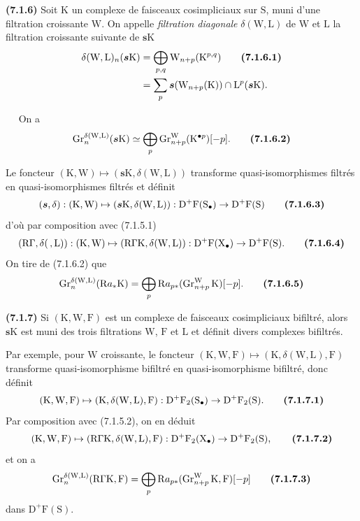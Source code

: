 \documentclass[11pt,leqno]{article}
\newcommand{\Page}[1]{\ifvmode\noindent\else\unskip\ \fi{\footnotesize\textcolor{gray}{[p.\,#1]}}\ \ignorespaces}
\begin{document}
\textbf{(7.1.6)} Soit \(\mathrm{K}\) un complexe de faisceaux cosimpliciaux sur \(\mathrm{S}\), muni d’une filtration croissante \(\mathrm{W}\). On appelle \textit{filtration diagonale} \(\delta(\mathrm{W},\mathrm{L})\) de \(\mathrm{W}\) et \(\mathrm{L}\) la filtration croissante suivante de \(\boldsymbol{s}\mathrm{K}\)
\begin{align*}
\delta(\mathrm{W},\mathrm{L})_n(\boldsymbol{s}\mathrm{K})
&=\bigoplus_{p,q}\mathrm{W}_{n+p}(\mathrm{K}^{p,q})
\tag*{\textbf{(7.1.6.1)}}\\
&=\sum_p\boldsymbol{s}(\mathrm{W}_{n+p}(\mathrm{K}))
\cap\mathrm{L}^{p}(\boldsymbol{s}\mathrm{K}).
\end{align*}

\Page{25}
On a
\[
\operatorname{Gr}_{n}^{\delta(\mathrm{W},\mathrm{L})}
(\boldsymbol{s}\mathrm{K})
\simeq
\bigoplus_p\operatorname{Gr}_{n+p}^{\mathrm{W}}
(\mathrm{K}^{\bullet p})[-p].
\tag*{\textbf{(7.1.6.2)}}
\]

Le foncteur \((\mathrm{K},\mathrm{W})\mapsto
(\boldsymbol{s}\mathrm{K},\delta(\mathrm{W},\mathrm{L}))\) transforme quasi-isomorphismes filtrés en quasi-isomorphismes filtrés et définit
\[
(\boldsymbol{s},\delta):
(\mathrm{K},\mathrm{W})\mapsto
(\boldsymbol{s}\mathrm{K},\delta(\mathrm{W},\mathrm{L})):
\mathrm{D}^{+}\mathrm{F}(\mathrm{S}_{\bullet})
\to\mathrm{D}^{+}\mathrm{F}(\mathrm{S})
\tag*{\textbf{(7.1.6.3)}}
\]
d’où par composition avec (7.1.5.1)
\[
(\mathrm{R}\Gamma,\delta(\, ,\mathrm{L})):
(\mathrm{K},\mathrm{W})\mapsto
(\mathrm{R}\Gamma\mathrm{K},\delta(\mathrm{W},\mathrm{L})):
\mathrm{D}^{+}\mathrm{F}(\mathrm{X}_{\bullet})
\to\mathrm{D}^{+}\mathrm{F}(\mathrm{S}).
\tag*{\textbf{(7.1.6.4)}}
\]
On tire de (7.1.6.2) que
\[
\operatorname{Gr}_{n}^{\delta(\mathrm{W},\mathrm{L})}
(\mathrm{R}a_{\ast}\mathrm{K})
=\bigoplus_p\mathrm{R}a_{p\ast}
(\operatorname{Gr}_{n+p}^{\mathrm{W}}\mathrm{K})[-p].
\tag*{\textbf{(7.1.6.5)}}
\]

\textbf{(7.1.7)} Si \((\mathrm{K},\mathrm{W},\mathrm{F})\) est un complexe de faisceaux cosimpliciaux bifiltré, alors \(\boldsymbol{s}\mathrm{K}\) est muni des trois filtrations \(\mathrm{W}\), \(\mathrm{F}\) et \(\mathrm{L}\) et définit divers complexes bifiltrés.

Par exemple, pour \(\mathrm{W}\) croissante, le foncteur \((\mathrm{K},\mathrm{W},\mathrm{F})\mapsto
(\mathrm{K},\delta(\mathrm{W},\mathrm{L}),\mathrm{F})\) transforme quasi-isomorphisme bifiltré en quasi-isomorphisme bifiltré, donc définit
\[
(\mathrm{K},\mathrm{W},\mathrm{F})\mapsto
(\mathrm{K},\delta(\mathrm{W},\mathrm{L}),\mathrm{F}):
\mathrm{D}^{+}\mathrm{F}_2(\mathrm{S}_{\bullet})
\to\mathrm{D}^{+}\mathrm{F}_2(\mathrm{S}).
\tag*{\textbf{(7.1.7.1)}}
\]
Par composition avec (7.1.5.2), on en déduit
\[
(\mathrm{K},\mathrm{W},\mathrm{F})\mapsto
(\mathrm{R}\Gamma\mathrm{K},\delta(\mathrm{W},\mathrm{L}),\mathrm{F}):
\mathrm{D}^{+}\mathrm{F}_2(\mathrm{X}_{\bullet})
\to\mathrm{D}^{+}\mathrm{F}_2(\mathrm{S}),
\tag*{\textbf{(7.1.7.2)}}
\]
et on a
\[
\operatorname{Gr}_{n}^{\delta(\mathrm{W},\mathrm{L})}
(\mathrm{R}\Gamma\mathrm{K},\mathrm{F})
=\bigoplus_p\mathrm{R}a_{p\ast}
(\operatorname{Gr}_{n+p}^{\mathrm{W}}\mathrm{K},\mathrm{F})[-p]
\tag*{\textbf{(7.1.7.3)}}
\]
dans \(\mathrm{D}^{+}\mathrm{F}(\mathrm{S})\).
\end{document}
